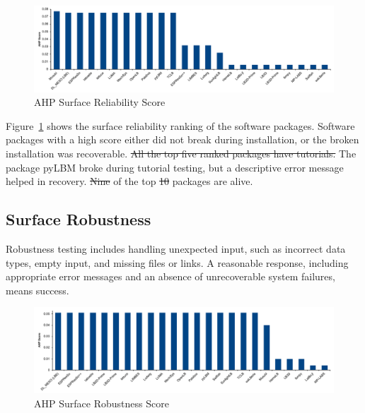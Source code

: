 \documentclass[final, 3p, times, authoryear]{elsarticle}
\providecommand{\DIFaddtex}[1]{{\protect\color{blue}\uwave{#1}}} %
\providecommand{\DIFdeltex}[1]{{\protect\color{red}\sout{#1}}}                      %
\providecommand{\DIFaddbegin}{} %
\providecommand{\DIFaddend}{} %
\providecommand{\DIFdelbegin}{} %
\providecommand{\DIFdelend}{} %
\providecommand{\DIFadd}[1]{\texorpdfstring{\DIFaddtex{#1}}{#1}} %
\providecommand{\DIFdel}[1]{\texorpdfstring{\DIFdeltex{#1}}{}} %
\begin{document}
\begin{figure}[h!]
	\begin{center}
		\includegraphics[width=1.0\textwidth]{./figures/reliability_chart.pdf}
		\caption{AHP Surface Reliability Score}
		\label{Fig_Reliability}
	\end{center}
\end{figure}

Figure~\ref{Fig_Reliability} shows the surface reliability ranking of the
software packages. Software packages with a high score either did not break
during installation, or the broken installation was recoverable. \DIFdelbegin \DIFdel{All the top
five ranked packages have tutorials. }\DIFdelend The package
pyLBM broke during tutorial testing, but a descriptive error message helped in
recovery. \DIFdelbegin \DIFdel{Nine }\DIFdelend \DIFaddbegin \DIFadd{Ten }\DIFaddend of the top \DIFdelbegin \DIFdel{10
}\DIFdelend \DIFaddbegin \DIFadd{11 }\DIFaddend packages are alive. 

\subsection{Surface Robustness} \label{Sec_Robustness}

Robustness testing includes handling unexpected input, such as incorrect data
types, empty input, and missing files or links. A reasonable response, including
appropriate error messages and an absence of unrecoverable system failures,
means success. 

\begin{figure}[h!]
	\begin{center}
		\includegraphics[width=1.0\textwidth]{./figures/robustness_chart.pdf}
		\caption{AHP Surface Robustness Score}
		\label{Fig_Robustness}
	\end{center}
\end{figure}
\end{document}
